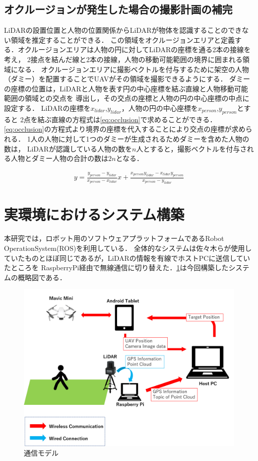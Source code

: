 \documentclass[autodetect-engine,dvipdfmx-if-dvi,ja=standard,a4j,jbase=10.5pt,twoside,twocolumn,magstyle=nomag*]{bxjsarticle}
\begin{document}
\subsection{オクルージョンが発生した場合の撮影計画の補完}
LiDARの設置位置と人物の位置関係からLiDARが物体を認識することのできない領域を推定することができる．
この領域をオクルージョンエリアと定義する．オクルージョンエリアは人物の円に対してLiDARの座標を通る2本の接線を考え，
2接点を結んだ線と2本の接線，人物の移動可能範囲の境界に囲まれる領域になる．
オクルージョンエリアに撮影ベクトルを付与するために架空の人物（ダミー）を配置することでUAVがその領域を撮影できるようにする．
ダミーの座標の位置は，LiDARと人物を表す円の中心座標を結ぶ直線と人物移動可能範囲の領域との交点を
導出し，その交点の座標と人物の円の中心座標の中点に設定する．
LiDARの座標を$x_{lidar}$,$y_{lidar}$，人物の円の中心座標を$x_{person}$,$y_{person}$とすると
2点を結ぶ直線の方程式は\cref{eq:occlusion}で求めることができる．\cref{eq:occlusion}の方程式より境界の座標を代入することにより交点の座標が求められる．
1人の人物に対して1つのダミーが生成されるためダミーを含めた人物の数は，
LiDARが認識している人物の数を$n$人とすると，撮影ベクトルを付与される人物とダミー人物の合計の数は$2n$となる．

\begin{equation}
    \begin{aligned}
       y = \frac{y_{person} - y_{lidar}}{x_{person} - x_{lidar}} x + 
\frac{x_{person}y_{lidar} - x_{lidar}y_{person}}{x_{person} - y_{lidar}}
    \end{aligned}
    \label{eq:occlusion}
\end{equation}


\section{実環境におけるシステム構築}
本研究では，ロボット用のソフトウェアプラットフォームであるRobot OperationSystem(ROS)を利用している．
全体的なシステムは佐々木らが使用していたものとほぼ同じであるが，LiDARの情報を有線でホストPCに送信していたところを
RaspberryPi経由で無線通信に切り替えた．\cref{fig:system}は今回構築したシステムの概略図である．

\begin{figure}[h]
    \centering
    \includegraphics[width=0.7\linewidth, clip]{./figure/communication_model.png}
    \caption{通信モデル}
    \label{fig:system}
\end{figure}
\end{document}
